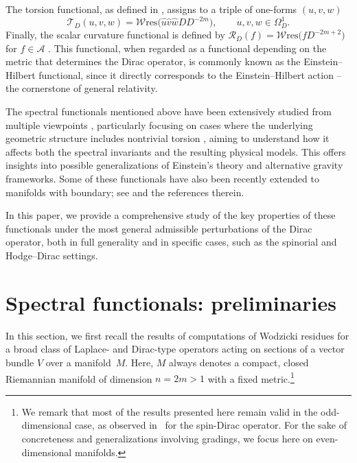 \documentclass[pdftex]{sigma}
\numberwithin{equation}{section}
\theoremstyle{definition}
\def\W{\mathscr{W} \mathrm{res}}
\begin{document}
The torsion functional, as defined in \cite[Definition~2.1]{dabrowski2024}, assigns to a triple of one-forms $(u,v,w)$
\[
	\mathscr{T}_D(u,v,w)= \W\bigl(\hat{u}\hat{v}\hat{w}D D^{-2m}\bigr), \qquad u,v,w\in \Omega^1_D.
\]
Finally, the scalar curvature functional is defined by $\mathscr{R}_D(f)=\W\bigl(fD^{-2m+2}\bigr)$ for $f\in \mathcal{A}$ \cite{Ackermann96,Kalau95}. This functional, when regarded as a functional depending on the metric that determines the Dirac operator, is commonly known as the Einstein--Hilbert functional, since it directly corresponds to the Einstein--Hilbert action -- the cornerstone of general relativity.

The spectral functionals mentioned above have been extensively studied from multiple viewpoints \cite{dabrowski2023,dabrowski2024, dabrowski2024a}, particularly focusing on cases where the underlying geometric structure includes nontrivial torsion \cite{bochniak2025,dabrowski2025}, aiming to understand how it affects both the spectral invariants and the resulting physical models. This offers insights into possible generalizations of Einstein’s theory and alternative gravity frameworks. Some of these functionals have also been recently extended to manifolds with boundary; see \cite{Yang24} and the references therein.

In this paper, we provide a comprehensive study of the key properties of these functionals under the most general admissible perturbations of the Dirac operator, both in full generality and in specific cases, such as the spinorial and Hodge--Dirac settings.

\section{Spectral functionals: preliminaries}
\label{sec:general}
In this section, we first recall the results of computations of Wodzicki residues for a broad class of Laplace- and Dirac-type operators acting on sections of a vector bundle $V$ over a manifold~$M$. Here, $M$ always denotes a compact, closed Riemannian manifold of dimension $n = 2m > 1$ with a fixed metric.\footnote{We remark that most of the results presented here remain valid in the odd-dimensional case, as observed in~\cite{bochniak2025} for the spin-Dirac operator. For the sake of concreteness and generalizations involving gradings, we focus here on even-dimensional manifolds.}
\end{document}
